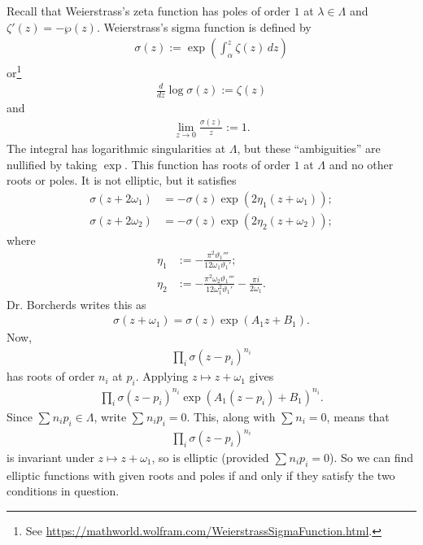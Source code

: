 \documentclass[11pt, oneside,margin=1in]{article}
\begin{document}
Recall that Weierstrass's zeta function has poles of order $1$ at $\lambda\in \Lambda$ and $\zeta' (z) = -\wp (z)$. Weierstrass's sigma function is defined by
\begin{align*}
	\sigma(z) := \exp  \left( \int_{\alpha}^{z} \zeta(z)  \, dz  \right) 
\end{align*}
or\footnote{See \url{https://mathworld.wolfram.com/WeierstrassSigmaFunction.html}.}
\begin{align*}
	\frac{d}{dz}\log \sigma(z):=  \zeta (z) 
\end{align*}
and
\begin{align*}
	\lim_{z\to 0} \frac{\sigma(z)}{z} := 1.
\end{align*}
The integral has logarithmic singularities at $\Lambda$, but these ``ambiguities'' are nullified by taking $\exp$. This function has roots of order $1$ at $\Lambda$ and no other roots or poles. It is not elliptic, but it satisfies
\begin{align*}
	\sigma(z + 2\omega_1) &= -\sigma(z)\exp(2\eta_1(z+\omega_1)) ;\\
	\sigma(z+2\omega_2) &= -\sigma(z)\exp (2\eta_2(z+\omega_2)) ;
\end{align*}
where
\begin{align*}
	\eta_1 &:= -\frac{\pi^2\vartheta_1'''}{12\omega_1\vartheta_1'};\\
	\eta_2 &:= - \frac{\pi^2\omega_2\vartheta_1'''}{12\omega_1^2\vartheta_1'}- \frac{\pi i }{2\omega_1}.
\end{align*}
Dr. Borcherds writes this as
\begin{align*}
	\sigma(z+\omega_1) = \sigma(z) \exp (A_1z+B_1).
\end{align*}
Now,
\begin{align*}
	\prod_i \sigma(z-p_i) ^{n_i}
\end{align*}
has roots of order $n_i$ at $p_i$. Applying $z\longmapsto z+\omega_1$ gives \begin{align*}
	\prod_i \sigma(z-p_i) ^{n_i} \exp(A_1(z-p_i) + B_1) ^{n_i}.
\end{align*}
Since $\sum_{}^{} n_ip_i\in \Lambda$, write $\sum_{}^{} n_ip_i = 0$. This, along with $\sum_{}^{} n_i=0$, means that
\begin{align*}
	\prod_i \sigma(z-p_i) ^{n_i}
\end{align*}
is invariant under $z\longmapsto z+\omega_1$, so is elliptic (provided $\sum_{}^{} n_ip_i=0$). So we can find elliptic functions with given roots and poles if and only if they satisfy the two conditions in question.
\end{document}

